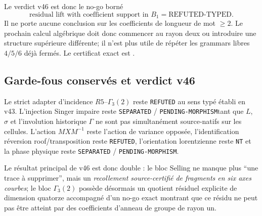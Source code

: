 \documentclass[11pt,a4paper]{article}
\newcommand{\certRefuted}{\texttt{REFUTED}}
\newcommand{\certSeparated}{\texttt{SEPARATED}}
\newcommand{\certPending}{\texttt{PENDING-MORPHISM}}
\newcommand{\certNT}{\texttt{NT}}
\begin{document}
Le verdict v46 est donc le no-go borné
\[
 \boxed{
 \text{residual lift with coefficient support in }B_1
 =\text{REFUTED-TYPED}.}
\]
Il ne porte aucune conclusion sur les coefficients de longueur de mot $\ge2$. Le prochain calcul algébrique doit donc commencer au rayon deux ou introduire une structure supérieure différente; il n'est plus utile de répéter les grammars libres $4/5/6$ déjà fermés. Le certificat exact est .

\subsection{Garde-fous conservés et verdict v46}

Le strict adapter d'incidence $R5$--$\Gamma_3(2)$ reste \certRefuted{} au sens typé établi en v43. L'injection Singer impaire reste \certSeparated{} / \certPending tant que $L$, $\sigma$ et l'involution historique $\Gamma$ ne sont pas simultanément source-natifs sur les cellules. L'action $MXM^{-1}$ reste l'action de variance opposée, l'identification réversion roof/transposition reste \certRefuted{}, l'orientation lorentzienne reste \certNT{} et la phase physique reste \certSeparated{} / \certPending.

Le résultat principal de v46 est donc double : le bloc Selling ne manque plus ``une trace à supprimer'', mais un \emph{recollement source-certifié de fragments en six axes courbes}; le bloc $\Gamma_3(2)$ possède désormais un quotient résiduel explicite de dimension quatorze accompagné d'un no-go exact montrant que ce résidu ne peut pas être atteint par des coefficients d'anneau de groupe de rayon un.
\end{document}
